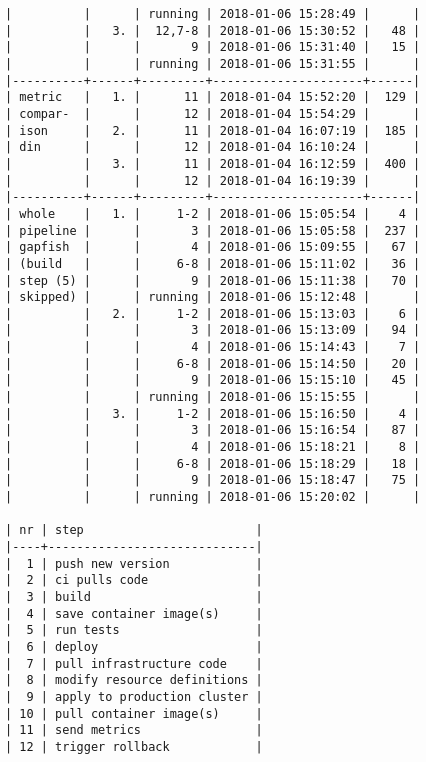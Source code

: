 \begin{verbatim}
|          |      | running | 2018-01-06 15:28:49 |      |
|          |   3. |  12,7-8 | 2018-01-06 15:30:52 |   48 |
|          |      |       9 | 2018-01-06 15:31:40 |   15 |
|          |      | running | 2018-01-06 15:31:55 |      |
|----------+------+---------+---------------------+------|
| metric   |   1. |      11 | 2018-01-04 15:52:20 |  129 |
| compar-  |      |      12 | 2018-01-04 15:54:29 |      |
| ison     |   2. |      11 | 2018-01-04 16:07:19 |  185 |
| din      |      |      12 | 2018-01-04 16:10:24 |      |
|          |   3. |      11 | 2018-01-04 16:12:59 |  400 |
|          |      |      12 | 2018-01-04 16:19:39 |      |
|----------+------+---------+---------------------+------|
| whole    |   1. |     1-2 | 2018-01-06 15:05:54 |    4 |
| pipeline |      |       3 | 2018-01-06 15:05:58 |  237 |
| gapfish  |      |       4 | 2018-01-06 15:09:55 |   67 |
| (build   |      |     6-8 | 2018-01-06 15:11:02 |   36 |
| step (5) |      |       9 | 2018-01-06 15:11:38 |   70 |
| skipped) |      | running | 2018-01-06 15:12:48 |      |
|          |   2. |     1-2 | 2018-01-06 15:13:03 |    6 |
|          |      |       3 | 2018-01-06 15:13:09 |   94 |
|          |      |       4 | 2018-01-06 15:14:43 |    7 |
|          |      |     6-8 | 2018-01-06 15:14:50 |   20 |
|          |      |       9 | 2018-01-06 15:15:10 |   45 |
|          |      | running | 2018-01-06 15:15:55 |      |
|          |   3. |     1-2 | 2018-01-06 15:16:50 |    4 |
|          |      |       3 | 2018-01-06 15:16:54 |   87 |
|          |      |       4 | 2018-01-06 15:18:21 |    8 |
|          |      |     6-8 | 2018-01-06 15:18:29 |   18 |
|          |      |       9 | 2018-01-06 15:18:47 |   75 |
|          |      | running | 2018-01-06 15:20:02 |      |

| nr | step                        |
|----+-----------------------------|
|  1 | push new version            |
|  2 | ci pulls code               |
|  3 | build                       |
|  4 | save container image(s)     |
|  5 | run tests                   |
|  6 | deploy                      |
|  7 | pull infrastructure code    |
|  8 | modify resource definitions |
|  9 | apply to production cluster |
| 10 | pull container image(s)     |
| 11 | send metrics                |
| 12 | trigger rollback            |
\end{verbatim}
